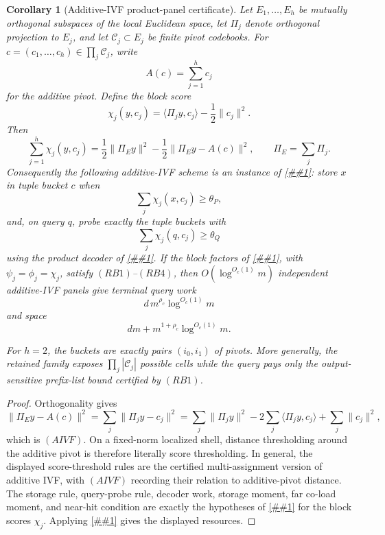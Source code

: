 \documentclass[10pt]{article}
\newcommand{\cref}[1]{\ref{##1}}
\newtheorem{corollary}[theorem]{Corollary}
\theoremstyle{definition}
\newcommand{\ip}[2]{\langle #1,#2\rangle}
\begin{document}
\begin{corollary}[Additive-IVF product-panel certificate]
   \label{cor:additive-ivf-product-panel}
   Let \(E_1,\ldots,E_h\) be mutually orthogonal subspaces of the local
   Euclidean space, let \(\Pi_j\) denote orthogonal projection to \(E_j\), and
   let \(\mathcal C_j\subset E_j\) be finite pivot codebooks.  For
   \(c=(c_1,\ldots,c_h)\in\prod_j\mathcal C_j\), write
   \[
      A(c)=\sum_{j=1}^h c_j
   \]
   for the additive pivot.  Define the block score
   \[
      \chi_j(y,c_j)=\ip{\Pi_jy}{c_j}-\frac12\|c_j\|^2 .
   \]
   Then
   \[
      \sum_{j=1}^h\chi_j(y,c_j)
      =
      \frac12\|\Pi_Ey\|^2
      -
      \frac12\|\Pi_Ey-A(c)\|^2,
      \qquad
      \Pi_E=\sum_j\Pi_j .
      \tag{AIVF}
   \]
   Consequently the following additive-IVF scheme is an instance of
   \cref{prop:product-panel-spectrum-compiler}: store \(x\) in tuple bucket
   \(c\) when
   \[
      \sum_j\chi_j(x,c_j)\ge\theta_P,
   \]
   and, on query \(q\), probe exactly the tuple buckets with
   \[
      \sum_j\chi_j(q,c_j)\ge\theta_Q
   \]
   using the product decoder of \cref{lem:additive-product-panel-decoder}.
   If the block factors of \cref{cor:product-panel-rate-bookkeeping}, with
   \(\psi_j=\phi_j=\chi_j\), satisfy \((RB1)\)--\((RB4)\), then
   \(O(\log^{O_c(1)}m)\) independent additive-IVF panels give terminal query
   work
   \[
      d\,m^{\rho_c}\log^{O_c(1)}m
   \]
   and space
   \[
      dm+m^{1+\rho_c}\log^{O_c(1)}m .
   \]

   For \(h=2\), the buckets are exactly pairs \((i_0,i_1)\) of pivots.  More
   generally, the retained family exposes \(\prod_j|\mathcal C_j|\) possible
   cells while the query pays only the output-sensitive prefix-list bound
   certified by \((RB1)\).
\end{corollary}

\begin{proof}
   Orthogonality gives
   \[
      \|\Pi_Ey-A(c)\|^2
      =
      \sum_j\|\Pi_jy-c_j\|^2
      =
      \sum_j\|\Pi_jy\|^2
      -2\sum_j\ip{\Pi_jy}{c_j}
      +\sum_j\|c_j\|^2,
   \]
   which is \((AIVF)\).  On a fixed-norm localized shell, distance thresholding
   around the additive pivot is therefore literally score thresholding.  In
   general, the displayed score-threshold rules are the certified
   multi-assignment version of additive IVF, with \((AIVF)\) recording their
   relation to additive-pivot distance.  The storage rule, query-probe rule,
   decoder work, storage moment, far co-load moment, and near-hit condition are
   exactly the hypotheses of \cref{cor:product-panel-rate-bookkeeping} for the
   block scores \(\chi_j\).  Applying
   \cref{prop:product-panel-spectrum-compiler} gives the displayed resources.
\end{proof}
\end{document}

